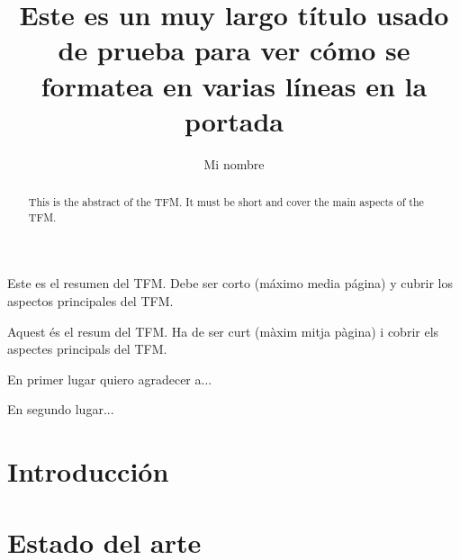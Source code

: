 \documentclass[twoside,english,a4paper,12pt]{plantilla/twcam-tfm-doc}
\title{Este es un muy largo título usado de prueba para ver cómo se formatea en varias líneas en la portada}
\author{Mi nombre}
\begin{document}
\renewcommand{\listtablename}{Índice de tablas}
\renewcommand{\tablename}{Tabla}

\portada
\cleardoublepage
\contraportada
\cleardoublepage
\declaracion
\cleardoublepage


\begin{resumen}
  Este es el resumen del TFM. Debe ser corto (máximo media página) y cubrir los aspectos principales del TFM.
\end{resumen}
\cleardoublepage

\begin{abstract}
  This is the abstract of the TFM. It must be short and cover the main aspects of the TFM.
\end{abstract}
\cleardoublepage

\begin{resum}
  Aquest és el resum del TFM. Ha de ser curt (màxim mitja pàgina) i cobrir els aspectes principals del TFM.
\end{resum}
\cleardoublepage


\begin{agradecimientos}
  En primer lugar quiero agradecer a...

  En segundo lugar...
\end{agradecimientos}
\cleardoublepage

\tableofcontents

\listoffigures

\cleardoublepage

\listoftables

\cleardoublepage

\lstlistoflistings

\cleardoublepage

\pagestyle{twcam}
\justify



\chapter{Introducción}


\chapter{Estado del arte}

\end{document}
